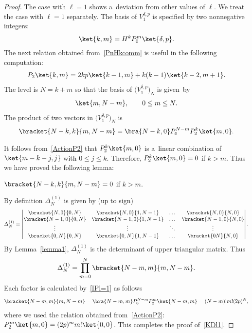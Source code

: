 \begin{proof}
The case with $ \ell = 1 $ shows a~deviation from other values of $ \ell$.
We treat the case with $ \ell = 1 $ separately.
The basis of $ V^{\delta,p}_1 $ is specif\/ied by two nonnegative integers:
\begin{gather*}
\ket{k,m} = H^k P_0^m \ket{\delta,p}.
\end{gather*}
The next relation obtained from~\eqref{PnHkcomm} is useful in the following computation:
\begin{gather}
P_2 \ket{k,m} = 2kp \ket{k-1,m} + k(k-1) \ket{k-2,m+1}.
\label{ActionP2}
\end{gather}
The level is $ N = k +m $ so that the basis of $ \big(V^{\delta,p}_1\big)_N $ is given~by
\begin{gather*}
\ket{m,N-m},
\qquad
0 \leq m \leq N.
\end{gather*}
The product of two vectors in $ \big(V^{\delta,p}_1\big)_N $ is
\begin{gather}
\bracket{N-k,k}{m,N-m} = \bra{N-k,0} P_0^{N-m} P_2^k \ket{m,0}.
\label{IPl=1}
\end{gather}

It follows from~\eqref{ActionP2} that $P_2^k \ket{m,0}$ is a~linear combination of $ \ket{m-k-j,j} $ with $0 \leq j
\leq k$.
Therefore, $ P_2^k \ket{m,0} = 0$ if $k > m$.
Thus we have proved the following lemma:

\begin{lemma}
\label{lemma1}
$ \bracket{N-k,k}{m,N-m} = 0 $ if $ k > m$.
\end{lemma}

By def\/inition $ \Delta^{(1)}_N $ is given by (up to sign)
\begin{gather*}
\Delta^{(1)}_N = \left|
\begin{matrix}
 \bracket{N,0}{0,N} & \bracket{N,0}{1,N-1} & \dots & \bracket{N,0}{N,0}
\\
\bracket{N-1,0}{0,N} & \bracket{N-1,0}{1,N-1} & \dots & \bracket{N-1,0}{N,0}
\\
\vdots & \vdots & \ddots & \vdots
\\
\bracket{0,N}{0,N} & \bracket{0,N}{1,N-1} & \dots & \bracket{0N}{N,0}
\end{matrix}
\right|.
\end{gather*}
By Lemma~\ref{lemma1}, $ \Delta^{(1)}_N $ is the determinant of upper triangular matrix.
Thus
\begin{gather*}
\Delta_N^{(1)} = \prod\limits_{m=0}^N \bracket{N-m,m}{m,N-m}.
\end{gather*}
Each factor is calculated by~\eqref{IPl=1} as follows
\begin{gather*}
\bracket{N-m,m}{m,N-m} = \bra{N-m,m} P_0^{N-m} P_2^m \ket{N-m,m} = (N-m)!   m!   (2p)^N,
\end{gather*}
where we used the relation obtained from~\eqref{ActionP2}: $ P_2^m \ket{m,0} = (2p)^m m ! \ket{0,0}$.
This completes the proof of~\eqref{KDl1}.


\end{proof}
